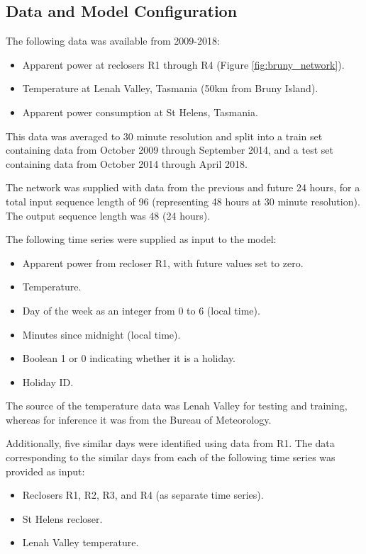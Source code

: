 \documentclass[conference]{IEEEtran}
\begin{document}
\subsection{Data and  Model Configuration}
The following data was available from 2009-2018:
\begin{itemize}
	\item Apparent power at reclosers R1 through R4 (Figure \ref{fig:bruny_network}).
	\item Temperature at Lenah Valley, Tasmania (50km from Bruny Island). 
	\item Apparent power consumption at St Helens, Tasmania.
\end{itemize}

This data was averaged to 30 minute resolution and split into a train set containing data from October 2009 through September 2014, and a test set containing data from October 2014 through April 2018.

The network was supplied with data from the previous and future 24 hours, for a total input sequence length of 96 (representing 48 hours at 30 minute resolution).
The output sequence length was 48 (24 hours).

The following time series were supplied as input to the model:
\begin{itemize}
	\item Apparent power from recloser R1, with future values set to zero.
	\item Temperature.
	\item Day of the week as an integer from 0 to 6 (local time).
	\item Minutes since midnight (local time).
	\item Boolean 1 or 0 indicating whether it is a holiday.
	\item Holiday ID.
\end{itemize}

The source of the temperature data was Lenah Valley for testing and training, whereas for inference it was from the Bureau of Meteorology.

Additionally, five similar days were identified using data from R1.
The data corresponding to the similar days from each of the following time series was provided as input:
\begin{itemize}
	\item Reclosers R1, R2, R3, and R4 (as separate time series).
	\item St Helens recloser.
	\item Lenah Valley temperature.
\end{itemize}
\end{document}
